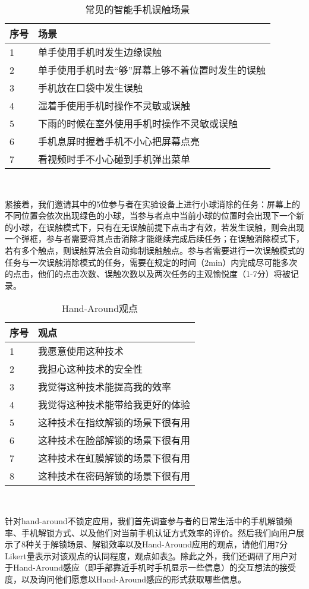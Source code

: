 \begin{table}[htbp]

\centering
\caption{常见的智能手机误触场景}
\label{MistouchTable}
\begin{tabular}{p{40 pt}p{280 pt}}
 \toprule
序号 & 场景 \\
 \midrule
1 & 单手使用手机时发生边缘误触 \\
2 & 单手使用手机时去“够”屏幕上够不着位置时发生的误触 \\
3 & 手机放在口袋中发生误触 \\
4 & 湿着手使用手机时操作不灵敏或误触 \\
5 & 下雨的时候在室外使用手机时操作不灵敏或误触 \\
6 & 手机息屏时握着手机不小心把屏幕点亮 \\
7 & 看视频时手不小心碰到手机弹出菜单 \\
\bottomrule
 \end{tabular}\\[2pt]
\end{table}

紧接着，我们邀请其中的5位参与者在实验设备上进行小球消除的任务：屏幕上的不同位置会依次出现绿色的小球，当参与者点中当前小球的位置时会出现下一个新的小球，在误触模式下，只有在无误触前提下点击才有效，若发生误触，则会出现一个弹框，参与者需要将其点击消除才能继续完成后续任务；在误触消除模式下，若有多个触点，则误触算法会自动抑制误触触点。参与者需要进行一次误触模式的任务与一次误触消除模式的任务，需要在规定的时间（2min）内完成尽可能多次的点击，他们的点击次数、误触次数以及两次任务的主观愉悦度（1-7分）将被记录。

\begin{table}[htbp]
\centering
\caption{Hand-Around观点}
\label{HandAroundOp}
\begin{tabular}{p{40 pt}p{200 pt}}
 \toprule
序号 & 观点 \\
 \midrule
1 & 我愿意使用这种技术 \\
2 & 我担心这种技术的安全性 \\
3 & 我觉得这种技术能提高我的效率 \\
4 & 我觉得这种技术能带给我更好的体验 \\
5 & 这种技术在指纹解锁的场景下很有用 \\
6 & 这种技术在脸部解锁的场景下很有用 \\
7 & 这种技术在虹膜解锁的场景下很有用 \\
8 & 这种技术在密码解锁的场景下很有用 \\
\bottomrule
 \end{tabular}\\[2pt]
\end{table}

针对hand-around不锁定应用，我们首先调查参与者的日常生活中的手机解锁频率、手机解锁方式、以及他们对当前手机认证方式效率的评价。然后我们向用户展示了8种关于解锁场景、解锁效率以及Hand-Around应用的观点，请他们用7分Likert量表示对该观点的认同程度，观点如表\ref{HandAroundOp}。除此之外，我们还调研了用户对于Hand-Around感应（即手部靠近手机时手机显示一些信息）的交互想法的接受度，以及询问他们愿意以Hand-Around感应的形式获取哪些信息。

